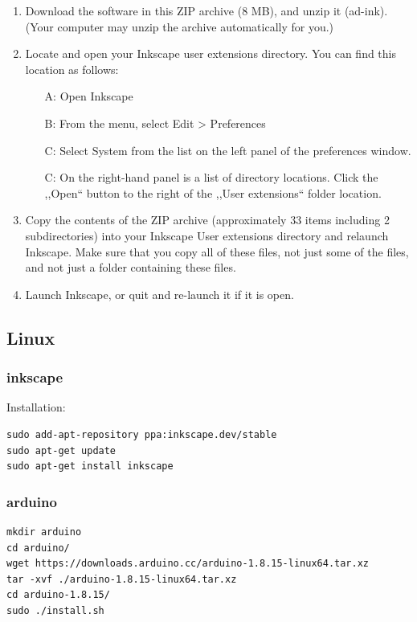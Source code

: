 \begin{enumerate}
  \item         Download the software in this ZIP archive (8 MB), and unzip it (ad-ink). (Your computer may unzip the archive automatically for you.)
  \item         Locate and open your Inkscape user extensions directory. You can find this location as follows:\begin{itemize}
  \item[A:]               Open Inkscape
  \item[B:]               From the menu, select Edit > Preferences
  \item[C:]               Select System from the list on the left panel of the preferences window.
  \item[C:]               On the right-hand panel is a list of directory locations. Click the ,,Open`` button to the right of the ,,User extensions`` folder location.
  \end{itemize}
  \item         Copy the contents of the ZIP archive (approximately 33 items including 2 subdirectories) into your Inkscape User extensions directory and relaunch Inkscape. Make sure that you copy all of these files, not just some of the files, and not just a folder containing these files.
  \item         Launch Inkscape, or quit and re-launch it if it is open.
\end{enumerate}

\subsection{Linux}
\subsubsection{inkscape}
Installation:
\begin{verbatim}
sudo add-apt-repository ppa:inkscape.dev/stable
sudo apt-get update
sudo apt-get install inkscape
\end{verbatim}

\subsubsection{arduino}
\begin{verbatim}
mkdir arduino
cd arduino/
wget https://downloads.arduino.cc/arduino-1.8.15-linux64.tar.xz
tar -xvf ./arduino-1.8.15-linux64.tar.xz
cd arduino-1.8.15/
sudo ./install.sh
\end{verbatim}


